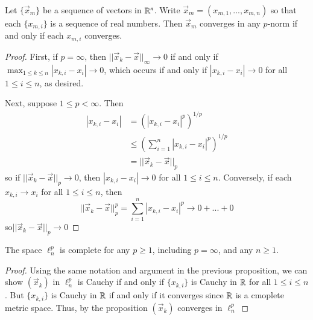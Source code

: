 \begin{thm}
    Let $\{\vec{x}_m\}$ be a sequence of vectors in $\mathbb R^n$. Write $\vec{x}_m = (x_{m,1},...,x_{m,n})$ so that each $\{x_{m,i}\}$ is a sequence of real numbers. Then $\vec{x}_m$ converges in any $p$-norm if and only if each $x_{m,i}$ converges.
\end{thm}
\begin{proof}
    First, if $p = \infty$, then $||\vec{x}_k-\vec{x}||_{\infty}\rightarrow 0$ if and only if $\max_{1\leq k \leq n}|x_{k,i}-x_i|\rightarrow 0$, which occurs if and only if $|x_{k,i}-x_i| \rightarrow 0$ for all $1 \leq i \leq n$, as desired.

    Next, suppose $1 \leq p < \infty$. Then \begin{align*}
        |x_{k,i} - x_i| &= (|x_{k,i}-x_i|^p)^{1/p} \\
        &\leq \left(\sum_{i=1}^n|x_{k,i} - x_i|^p\right)^{1/p} \\
        &= ||\vec{x}_k - \vec{x}||_p
    \end{align*}
    so if $||\vec{x}_k-\vec{x}||_p\rightarrow 0$, then $|x_{k,i} - x_i|\rightarrow 0$ for all $1 \leq i \leq n$. Conversely, if each $x_{k,i}\rightarrow x_i$ for all $1 \leq i \leq n$, then $$||\vec{x}_k-\vec{x}||_p^p = \sum_{i=1}^n|x_{k,i}-x_i|^p \rightarrow 0+...+0$$ so$ ||\vec{x}_k-\vec{x}||_p\rightarrow 0$
\end{proof}

\begin{cor}
    The space $\ell_n^p$ is complete for any $p \geq 1$, including $p = \infty$, and any $n \geq 1$.
\end{cor}
\begin{proof}
    Using the same notation and argument in the previous proposition, we can show $(\vec{x}_k)$ in $\ell_n^p$ is Cauchy if and only if $\{x_{k,i}\}$ is Cauchy in $\mathbb R$ for all $1 \leq i \leq n$. But $\{x_{k,i}\}$ is Cauchy in $\mathbb R$ if and only if it converges since $\mathbb R$ is a cmoplete metric space. Thus, by the proposition $(\vec{x}_k)$ converges in $\ell_n^p$
\end{proof}


